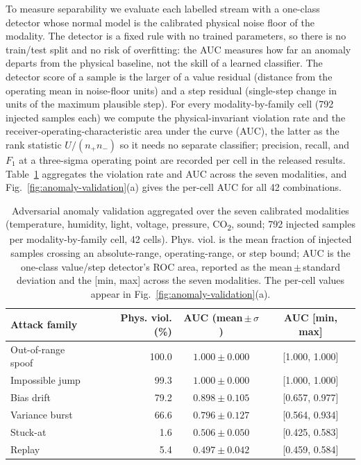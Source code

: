 \documentclass[jsan,article,submit,moreauthors,pdftex]{Definitions/mdpi}
\begin{document}
To measure separability we evaluate each labelled stream with a one-class detector whose normal model is the calibrated physical noise floor of the modality. The detector is a fixed rule with no trained parameters, so there is no train/test split and no risk of overfitting: the AUC measures how far an anomaly departs from the physical baseline, not the skill of a learned classifier. The detector score of a sample is the larger of a value residual (distance from the operating mean in noise-floor units) and a step residual (single-step change in units of the maximum plausible step). For every modality-by-family cell (792 injected samples each) we compute the physical-invariant violation rate and the receiver-operating-characteristic area under the curve (AUC), the latter as the rank statistic $U/(n_{+}n_{-})$ so it needs no separate classifier; precision, recall, and $F_1$ at a three-sigma operating point are recorded per cell in the released results. Table~\ref{tab:anomaly-validation} aggregates the violation rate and AUC across the seven modalities, and Fig.~\ref{fig:anomaly-validation}(a) gives the per-cell AUC for all 42 combinations.

\begin{table}[H]
\centering
\caption{Adversarial anomaly validation aggregated over the seven calibrated modalities (temperature, humidity, light, voltage, pressure, CO\textsubscript{2}, sound; 792 injected samples per modality-by-family cell, 42 cells). Phys. viol. is the mean fraction of injected samples crossing an absolute-range, operating-range, or step bound; AUC is the one-class value/step detector's ROC area, reported as the mean\,$\pm$\,standard deviation and the [min, max] across the seven modalities. The per-cell values appear in Fig.~\ref{fig:anomaly-validation}(a).}
\label{tab:anomaly-validation}
\small
\begin{tabular}{l r c c}
\hline
\textbf{Attack family} & \textbf{Phys. viol. (\%)} & \textbf{AUC (mean\,$\pm\,\sigma$)} & \textbf{AUC [min, max]} \\
\hline
Out-of-range spoof & 100.0 & $1.000 \pm 0.000$ & [1.000, 1.000] \\
Impossible jump    & 99.3  & $1.000 \pm 0.000$ & [1.000, 1.000] \\
Bias drift         & 79.2  & $0.898 \pm 0.105$ & [0.657, 0.977] \\
Variance burst     & 66.6  & $0.796 \pm 0.127$ & [0.564, 0.934] \\
Stuck-at           & 1.6   & $0.506 \pm 0.050$ & [0.425, 0.583] \\
Replay             & 5.4   & $0.497 \pm 0.042$ & [0.459, 0.584] \\
\hline
\end{tabular}
\end{table}
\end{document}
